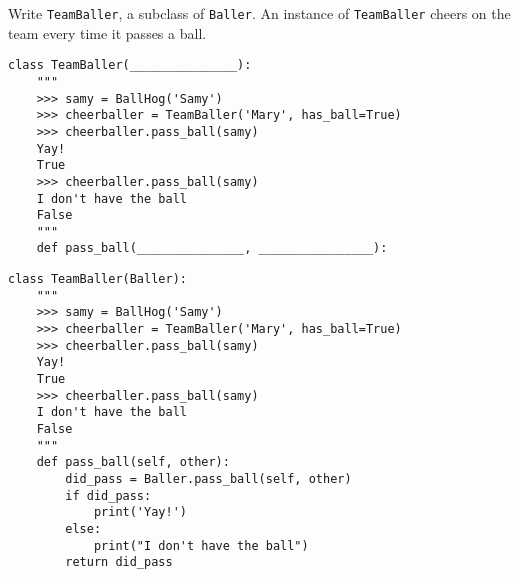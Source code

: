\begin{blocksection}
\question Write \lstinline$TeamBaller$, a subclass of \lstinline$Baller$. An instance of \lstinline$TeamBaller$ cheers on the team every time it passes a ball.

\ifprintanswers\else
\begin{lstlisting}
class TeamBaller(_______________):
    """
    >>> samy = BallHog('Samy')
    >>> cheerballer = TeamBaller('Mary', has_ball=True)
    >>> cheerballer.pass_ball(samy)
    Yay!
    True
    >>> cheerballer.pass_ball(samy)
    I don't have the ball
    False
    """
    def pass_ball(_______________, ________________):
\end{lstlisting}
\fi

\begin{solution}[1in]
\begin{lstlisting}
class TeamBaller(Baller):
    """
    >>> samy = BallHog('Samy')
    >>> cheerballer = TeamBaller('Mary', has_ball=True)
    >>> cheerballer.pass_ball(samy)
    Yay!
    True
    >>> cheerballer.pass_ball(samy)
    I don't have the ball
    False
    """
    def pass_ball(self, other):
        did_pass = Baller.pass_ball(self, other)
        if did_pass:
            print('Yay!')
        else:
            print("I don't have the ball")
        return did_pass
\end{lstlisting}
\end{solution}
\end{blocksection}
